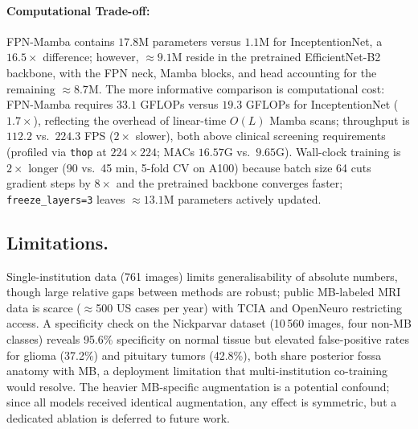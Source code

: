 \documentclass[runningheads]{llncs}
\begin{document}
\paragraph{Computational Trade-off:}
FPN-Mamba contains $17.8$M parameters versus $1.1$M for InceptentionNet, a $16.5\times$ difference; however, $\approx9.1$M reside in the pretrained EfficientNet-B2 backbone, with the FPN neck, Mamba blocks, and head accounting for the remaining $\approx8.7$M. The more informative comparison is computational cost: FPN-Mamba requires $33.1$ GFLOPs versus $19.3$ GFLOPs for InceptentionNet ($1.7\times$), reflecting the overhead of linear-time $O(L)$ Mamba scans; throughput is $112.2$ vs.\ $224.3$ FPS ($2\times$ slower), both above clinical screening requirements (profiled via \texttt{thop} at $224\times224$; MACs $16.57$G vs.\ $9.65$G). Wall-clock training is $2\times$ longer (90 vs.\ 45 min, 5-fold CV on A100) because batch size 64 cuts gradient steps by $8\times$ and the pretrained backbone converges faster; \texttt{freeze\_layers=3} leaves $\approx13.1$M parameters actively updated.

\subsection{Limitations.}
Single-institution data (761 images) limits generalisability of absolute numbers, though large relative gaps between methods are robust; public MB-labeled MRI data is scarce ($\approx$500 US cases per year) with TCIA and OpenNeuro restricting access. A specificity check on the Nickparvar dataset \cite{nickparvar2021} (10\,560 images, four non-MB classes) reveals 95.6\% specificity on normal tissue but elevated false-positive rates for glioma (37.2\%) and pituitary tumors (42.8\%), both share posterior fossa anatomy with MB, a deployment limitation that multi-institution co-training would resolve. The heavier MB-specific augmentation is a potential confound; since all models received identical augmentation, any effect is symmetric, but a dedicated ablation is deferred to future work.
\end{document}
